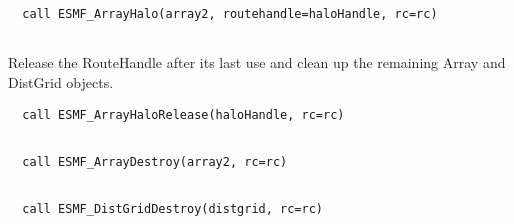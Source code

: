  \begin{verbatim}
  call ESMF_ArrayHalo(array2, routehandle=haloHandle, rc=rc)
 
\end{verbatim}
 

   Release the RouteHandle after its last use and clean up the remaining
   Array and DistGrid objects. 

 \begin{verbatim}
  call ESMF_ArrayHaloRelease(haloHandle, rc=rc)
 
\end{verbatim}
 

 \begin{verbatim}
  call ESMF_ArrayDestroy(array2, rc=rc)
 
\end{verbatim}
 

 \begin{verbatim}
  call ESMF_DistGridDestroy(distgrid, rc=rc)
 
\end{verbatim}

\setlength{\parskip}{\oldparskip}
\setlength{\parindent}{\oldparindent}
\setlength{\baselineskip}{\oldbaselineskip}
